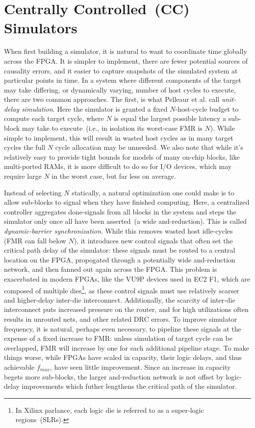 \section{Centrally Controlled~(CC) Simulators}

When first building a simulator, it is natural to want to coordinate time
globally across the FPGA. It is simpler to implement, there are fewer potential
sources of causality errors, and it easier to capture snapshots of the simulated system at particular points in
time. In a system where different components of the target may take differing,
or dynamically varying, number of host cycles to execute, there are two
common approaches.  The first, is what Pelleaur et al. call \emph{unit-delay
simulation}. Here the simulator is granted a fixed $N$-host-cycle budget to
compute each target cycle, where $N$ is equal the largest possible
latency a sub-block may take to execute~(i.e., in isolation its worst-case FMR is $N$). While simple to
implement, this will result in wasted host cycles as in many target cycles the
full $N$ cycle allocation may be unneeded.  We also note that while it's
relatively easy to provide tight bounds for models of many on-chip
blocks, like multi-ported RAMs, it is more difficult to do so for I/O devices, which may require large $N$
in the worst case, but far less on average.

Instead of selecting $N$ statically, a natural optimization one could make is to allow sub-blocks to signal when they have
finished computing. Here, a centralized controller aggregates done-signals from all
blocks in the system and steps the simulator only once all have been
asserted~(a wide and-reduction). This is called \emph{dynamic-barrier
synchronization}. While this removes wasted host idle-cycles (FMR can fall
below $N$), it introduces new control signals that often set the critical
path delay of the simulator: these signals must be routed to a central
location on the FPGA, propogated through a potentially wide and-reduction network, and then fanned out again across the FPGA.
This problem is exacerbated in modern FPGAs, like the VU9P devices used in EC2 F1, which are composed of multiple
dies\footnote{In Xilinx parlance, each logic die is referred to as a
super-logic regions~(SLRs).}, as these control signals must use relatively
scarser and higher-delay inter-die interconnect. Additionally, the scarcity of inter-die interconnect
puts increased pressure on the router, and for high utilizations often results
in unrouted nets, and other related DRC errors.  To improve simulator
frequency, it is natural, perhaps even necessary, to pipeline these signals at
the expense of a fixed increase to FMR: unless simulation of target cycle can
be overlapped, FMR will increase by one for each additional pipeline stage. To make things worse, while
FPGAs have scaled in capacity, their logic delays, and thus achievable
$f_{max}$, have seen little improvement. Since an increase in capacity begets
more sub-blocks, the larger and-reduction network is not offset by logic-delay
improvements which futher lengthens the critical path of the simulator.

